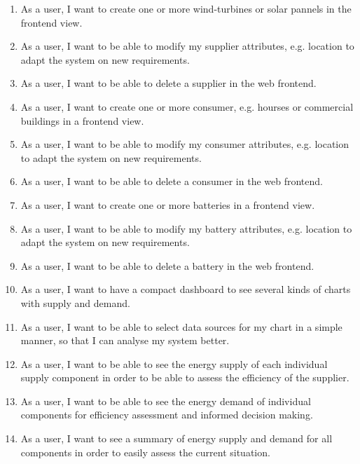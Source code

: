 \begin{enumerate}
\item As a user, I want to create one or more wind-turbines or solar pannels in the frontend view.

\item As a user, I want to be able to modify my supplier attributes, e.g. location to adapt the system on new requirements.

\item As a user, I want to be able to delete a supplier in the web frontend.

\item As a user, I want to create one or more consumer, e.g. hourses or commercial buildings in a frontend view.

\item As a user, I want to be able to modify my consumer attributes, e.g. location to adapt the system on new requirements.

\item As a user, I want to be able to delete a consumer in the web frontend.

\item As a user, I want to create one or more batteries in a frontend view.

\item As a user, I want to be able to modify my battery attributes, e.g. location to adapt the system on new requirements.

\item As a user, I want to be able to delete a battery in the web frontend.

\item As a user, I want to have a compact dashboard to see several kinds of charts with supply and demand.

\item As a user, I want to be able to select data sources for my chart in a simple manner, so that I can analyse my system better. 

\item As a user, I want to be able to see the energy supply of each individual supply component in order to be able to assess the efficiency of the supplier.

\item As a user, I want to be able to see the energy demand of individual components for efficiency assessment and informed decision making. 

\item As a user, I want to see a summary of energy supply and demand for all components in order to easily assess the current situation.


\end{enumerate}
